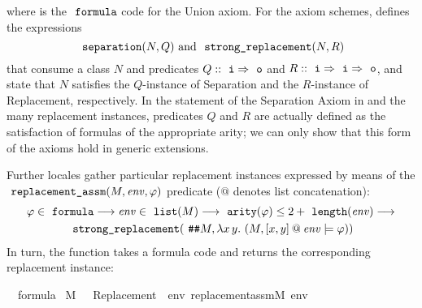 where  is the $\formula$ code for the
Union axiom. For the axiom schemes,  defines
the expressions
\[
  \isatt{separation}(N,Q)
  \text{ and }
  \isatt{strong{\uscore}replacement}(N,R)
\]
that consume a class $N$ and predicates $Q::\tyi\fun\tyo$ and $R::\tyi\fun\tyi\fun\tyo$, and state that $N$
satisfies the $Q$-instance of Separation and the $R$-instance of
Replacement, respectively. In the statement of the Separation Axiom in
 and
the many replacement instances, predicates $Q$ and $R$ are actually
defined as the satisfaction of formulas of the appropriate arity; we can only show
that this form of the axioms hold in generic extensions. 

Further locales gather
particular replacement instances expressed by means of the
$\isatt{replacement{\uscore}assm}(M,\mathit{env},\phi)$ predicate ($@$ denotes
list concatenation):
\begin{multline}\label{eq:replacement_assm_def}
\varphi \in \formula  \limp \mathit{env} \in \isatt{list}(M) \limp \isatt{arity}(\varphi) \leq 2+ \isatt{length}(\mathit{env}) \limp \\
 \isatt{strong{\uscore}replacement}(\isatt{\#\#} M, \lambda x\, y.\ (M, [x,y]
\mathbin{@} \mathit{env}  \models \varphi))
\end{multline}
In turn, the  function
takes a formula code and returns the corresponding replacement
instance:
\begin{isabelle}
{\isasymphi}\ {\isasymin}\ formula\ {\isasymLongrightarrow}\isanewline
{\isacharparenleft}{\kern0pt}M{\isacharcomma}{\kern0pt}\ {\isacharbrackleft}{\kern0pt}{\isacharbrackright}{\kern0pt}\ {\isasymTurnstile}\ {\isasymcdot}Replacement{\isacharparenleft}{\kern0pt}{\isasymphi}{\isacharparenright}{\kern0pt}{\isasymcdot}{\isacharparenright}{\kern0pt}\ {\isasymlongleftrightarrow}\ {\isacharparenleft}{\kern0pt}{\isasymforall}env{\isachardot}{\kern0pt}\ replacement{\isacharunderscore}{\kern0pt}assm{\isacharparenleft}{\kern0pt}M{\isacharcomma}{\kern0pt}\ env{\isacharcomma}{\kern0pt}\ {\isasymphi}{\isacharparenright}{\kern0pt}{\isacharparenright}
\end{isabelle}
